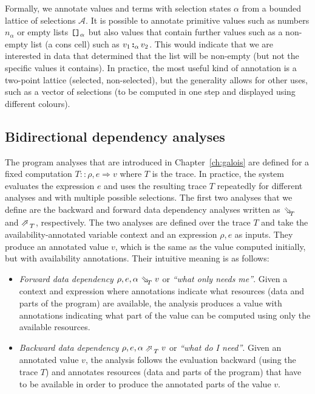 \documentclass[fleqn,11pt]{report}
\theoremstyle{definition}
\newenvironment{nitemize}
{ \vspace{-0.4em}
  \begin{itemize}
    \setlength{\itemsep}{5pt}
    \setlength{\parskip}{0pt}
    \setlength{\parsep}{0pt} }
{ \end{itemize}
  \vspace{-0.4em} }
\begin{document}
Formally, we annotate values and terms with selection states $\alpha$ from a bounded
lattice of selections $\mathcal{A}$. It is possible to annotate primitive values such as
numbers $n_\alpha$ or empty lists $\textnormal{\texttt{[]}}_\alpha$ but also values that
contain further values such as a non-empty list (a cons cell) such as
$v_1\, \textnormal{\textbf{:}}_\alpha\, v_2$. This would indicate that we are interested in
data that determined that the list will be non-empty (but not the specific values it contains).
In practice, the most useful kind of annotation is a two-point lattice (selected, non-selected),
but the generality allows for other uses, such as a vector of selections (to be computed in one
step and displayed using different colours).

\subsection{Bidirectional dependency analyses}

The program analyses that are introduced in Chapter~\ref{ch:galois} are defined for a fixed
computation $T :: \rho, e \Rightarrow v$ where $T$ is the trace. In practice, the system evaluates
the expression $e$ and uses the resulting trace $T$ repeatedly for different analyses and
with multiple possible selections. The first two analyses that we define are the backward and
forward data dependency analyses written as $\evalFwdR{T}$ and $\evalBwdR{T}$, respectively.
The two analyses are defined over the trace $T$ and take the availability-annotated
variable context and an expression $\rho, e$ as inputs. They produce an annotated value
$v$, which is the same as the value computed initially, but with availability annotations.
Their intuitive meaning is as follows:

\begin{nitemize}
\item \emph{Forward data dependency} $\rho, e, \alpha\; \evalFwdR{T}\; v$ or \emph{``what only needs me''}.
  Given a context and expression where annotations indicate what resources (data and parts of
  the program) are available, the analysis produces a value with annotations indicating what
  part of the value can be computed using only the available resources.
\item\emph{Backward data dependency} $\rho, e, \alpha\; \evalBwdR{T}\; v$ or \emph{``what do I need''}.
  Given an annotated value $v$, the analysis follows the evaluation backward (using the trace
  $T$) and annotates resources (data and parts of the program) that have to be available in
  order to produce the annotated parts of the value $v$.
\end{nitemize}
\end{document}
